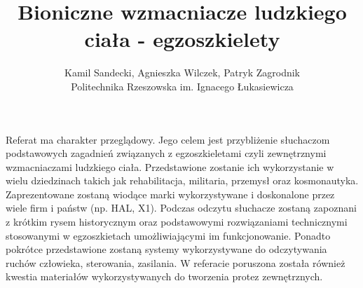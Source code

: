\documentclass[12pt, a4paper]{article}
\begin{document}
\title{Bioniczne wzmacniacze ludzkiego ciała - egzoszkielety}
\author{Kamil Sandecki, Agnieszka Wilczek, Patryk Zagrodnik \\Politechnika Rzeszowska im. Ignacego Łukasiewicza}
\date {}
\maketitle
\thispagestyle{title}
Referat ma charakter przeglądowy. Jego celem jest przybliżenie słuchaczom podstawowych zagadnień związanych z egzoszkieletami czyli zewnętrznymi wzmacniaczami ludzkiego ciała. Przedstawione zostanie ich wykorzystanie w wielu dziedzinach takich jak rehabilitacja, militaria, przemysł oraz kosmonautyka. Zaprezentowane zostaną wiodące marki wykorzystywane i doskonalone przez wiele firm i państw (np. HAL, X1). Podczas odczytu słuchacze zostaną zapoznani z krótkim rysem historycznym oraz podstawowymi rozwiązaniami technicznymi stosowanymi w egzoszkietach umożliwiającymi im funkcjonowanie. Ponadto pokrótce przedstawione zostaną systemy wykorzystywane do odczytywania ruchów człowieka, sterowania, zasilania. W referacie poruszona została również kwestia materiałów wykorzystywanych do tworzenia protez zewnętrznych.
\end{document}
